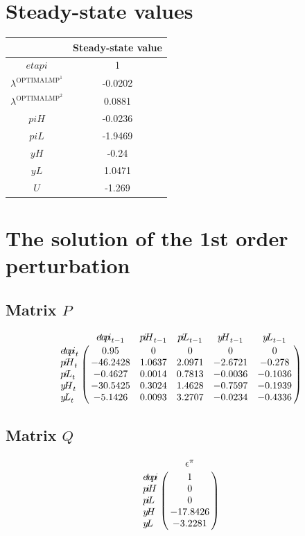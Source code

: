 

\section{Steady-state values}


\begin{tabular}{c|c|}
  & Steady-state value\\
\hline
${e\!t\!a\!p\!i}$ & 1 \\
$\lambda^{\mathrm{OPTIMALMP}^{\mathrm{1}}}$ & -0.0202 \\
$\lambda^{\mathrm{OPTIMALMP}^{\mathrm{2}}}$ & 0.0881 \\
${p\!i\!H}$ & -0.0236 \\
${p\!i\!L}$ & -1.9469 \\
${y\!H}$ & -0.24 \\
${y\!L}$ & 1.0471 \\
$U$ & -1.269 \\
\hline
\end{tabular}


\section{The solution of the 1st order perturbation}

\subsection*{Matrix $P$}

$$\bordermatrix{
~ & {e\!t\!a\!p\!i}_{t-1} & {p\!i\!H}_{t-1} & {p\!i\!L}_{t-1} & {y\!H}_{t-1} & {y\!L}_{t-1} \cr
{e\!t\!a\!p\!i}_{t} & 0.95 & 0 & 0 & 0 & 0 \cr
{p\!i\!H}_{t} & -46.2428 & 1.0637 & 2.0971 & -2.6721 & -0.278 \cr
{p\!i\!L}_{t} & -0.4627 & 0.0014 & 0.7813 & -0.0036 & -0.1036 \cr
{y\!H}_{t} & -30.5425 & 0.3024 & 1.4628 & -0.7597 & -0.1939 \cr
{y\!L}_{t} & -5.1426 & 0.0093 & 3.2707 & -0.0234 & -0.4336 \cr
}$$

\subsection*{Matrix $Q$}

$$\bordermatrix{
~ & \epsilon^{\pi} \cr
{e\!t\!a\!p\!i} & 1 \cr
{p\!i\!H} & 0 \cr
{p\!i\!L} & 0 \cr
{y\!H} & -17.8426 \cr
{y\!L} & -3.2281 \cr
}$$

